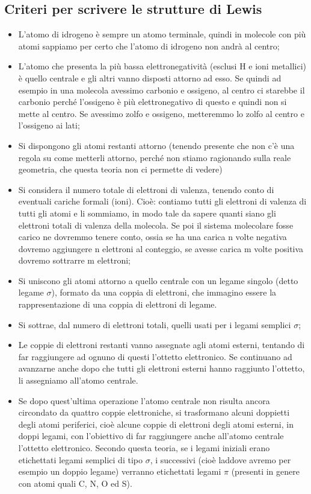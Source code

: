 \subsection{Criteri per scrivere le strutture di Lewis}
\begin{itemize}[leftmargin=0.5cm]
    \item L'atomo di idrogeno è sempre un atomo terminale, quindi in molecole con più atomi sappiamo per certo che l'atomo di idrogeno non andrà al centro;
    \item L'atomo che presenta la più bassa elettronegatività (esclusi H e ioni metallici) è quello centrale e gli altri vanno disposti attorno ad esso. Se quindi ad esempio in una molecola avessimo carbonio e ossigeno, al centro ci starebbe il carbonio perché l'ossigeno è più elettronegativo di questo e quindi non si mette al centro. Se avessimo zolfo e ossigeno, metteremmo lo zolfo al centro e l'ossigeno ai lati;
    \item Si dispongono gli atomi restanti attorno (tenendo presente che non c'è una regola su come metterli attorno, perché non stiamo ragionando sulla reale geometria, che questa teoria non ci permette di vedere)
    \item Si considera il numero totale di elettroni di valenza, tenendo conto di eventuali cariche formali (ioni). Cioè: contiamo tutti gli elettroni di valenza di tutti gli atomi e li sommiamo, in modo tale da sapere quanti siano gli elettroni totali di valenza della molecola. Se poi il sistema molecolare fosse carico ne dovremmo tenere conto, ossia se ha una carica n volte negativa dovremo aggiungere n elettroni al conteggio, se avesse carica m volte positiva dovremo sottrarre m elettroni;
    \item Si uniscono gli atomi attorno a quello centrale con un legame singolo (detto legame $\sigma$), formato da una coppia di elettroni, che immagino essere la rappresentazione di una coppia di elettroni di legame. 
    \item Si sottrae, dal numero di elettroni totali, quelli usati per i legami semplici $\sigma$;
    \item Le coppie di elettroni restanti vanno assegnate agli atomi esterni, tentando di far raggiungere ad ognuno di questi l'ottetto elettronico. Se continuano ad avanzarne anche dopo che tutti gli elettroni esterni hanno raggiunto l'ottetto, li assegniamo all'atomo centrale.
    \item Se dopo quest'ultima operazione l'atomo centrale non risulta ancora circondato da quattro coppie elettroniche, si trasformano alcuni doppietti degli atomi periferici, cioè alcune coppie di elettroni degli atomi esterni, in doppi legami, con l'obiettivo di far raggiungere anche all'atomo centrale l'ottetto elettronico. Secondo questa teoria, se i  legami iniziali erano etichettati legami semplici di tipo $\sigma$, i successivi (cioè laddove avremo per esempio un doppio legame) verranno etichettati legami $\pi$ (presenti in genere con atomi quali C, N, O ed S).
\end{itemize}


